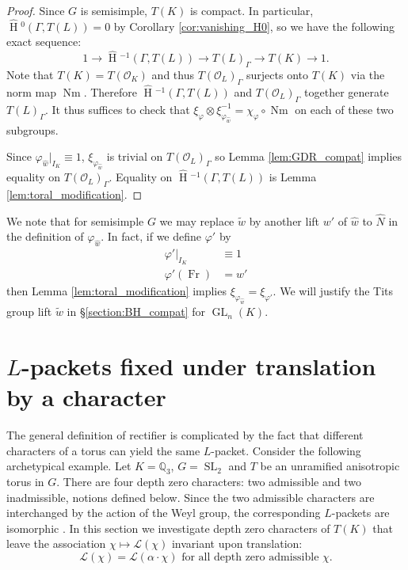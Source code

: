 \documentclass{compositio}
\theoremstyle{plain}
\newcommand{\HT}[1]{\hat{\HH}{}^{#1}}
\theoremstyle{definition}
\DeclareMathOperator{\HH}{H}
\DeclareMathOperator{\Nm}{Nm}
\DeclareMathOperator{\Fr}{Fr}
\DeclareMathOperator{\GL}{GL}
\DeclareMathOperator{\SL}{SL}
\newcommand{\OK}{\mathcal{O}_K}
\newcommand{\OL}{\mathcal{O}_L}
\newcommand{\QQ}{\mathbb{Q}}
\newcommand{\Lpack}{\mathcal{L}}
\begin{document}
\begin{proof}
Since $G$ is semisimple, $T(K)$ is compact.  In particular,
$\HT{0}(\Gamma, T(L)) = 0$ by Corollary \ref{cor:vanishing_H0},
so we have the following exact sequence:
$$1 \rightarrow \HT{-1}(\Gamma, T(L)) \rightarrow T(L)_{\Gamma} \rightarrow T(K) \rightarrow 1.$$
Note that $T(K) = T(\OK)$ and thus
$T(\OL)_{\Gamma}$ surjects onto $T(K)$ via the norm map
$\Nm$.  Therefore $\HT{-1}(\Gamma,T(L))$ and
$T(\OL)_{\Gamma}$ together generate $T(L)_{\Gamma}$.  It thus suffices to check that
$\xi_{\varphi} \otimes \xi_{\varphi_{\hat{w}}}^{-1} = \chi_{\varphi} \circ \Nm$
on each of these two subgroups.

Since $\varphi_{\hat{w}}|_{I_K} \equiv 1$, $\xi_{\varphi_{\hat{w}}}$ is trivial on
$T(\OL)_{\Gamma}$ so Lemma
\ref{lem:GDR_compat} implies equality on $T(\OL)_{\Gamma}$.
Equality on $\HT{-1}(\Gamma,T(L))$ is Lemma \ref{lem:toral_modification}.
\end{proof}

We note that for semisimple $G$ we may replace $\tilde{w}$ by another
lift $w'$ of $\hat{w}$ to $\hat{N}$ in the definition of $\varphi_{\hat{w}}$.
In fact, if we define $\varphi'$ by
\begin{align*}
\varphi'|_{I_K} &\equiv 1 \\
\varphi'(\Fr) &= w'
\end{align*}
then Lemma \ref{lem:toral_modification} implies $\xi_{\varphi_{\hat{w}}} = \xi_{\varphi'}$.
We will justify the Tits group lift $\tilde{w}$ in \S\ref{section:BH_compat} for $\GL_n(K)$.

\section{$L$-packets fixed under translation by a character}\label{Q_T}

The general definition of rectifier is complicated by the fact that different
characters of a torus can yield the same $L$-packet.  Consider the following archetypical example.
Let $K = \QQ_3$, $G = \SL_2$ and $T$ be an unramified anisotropic torus in $G$.  There are four depth zero
characters: two admissible and two inadmissible, notions defined below.  Since the two admissible characters are interchanged
by the action of the Weyl group, the corresponding $L$-packets are isomorphic \cite[\S10]{murnaghan:11}.
In this section we investigate depth zero characters of $T(K)$ that leave the association $\chi \mapsto \Lpack(\chi)$ invariant upon translation:
$$\Lpack(\chi) = \Lpack(\alpha\cdot\chi) \mbox{ for all depth zero admissible $\chi$}.$$
\end{document}

